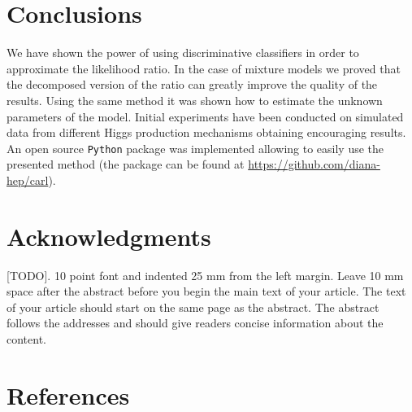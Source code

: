 \documentclass[a4paper]{jpconf}
\begin{document}



\section{Conclusions}
We have shown the power of using discriminative classifiers in order to approximate the likelihood ratio. In the case of mixture models we proved that the decomposed version of the ratio can greatly improve the quality of the results. Using the same method it was shown how to estimate the unknown parameters of the model. Initial experiments have been conducted on simulated data from different Higgs production mechanisms obtaining encouraging results. An open source \texttt{Python} package was implemented allowing to easily use the presented method (the package can be found at \url{https://github.com/diana-hep/carl}).
\section{Acknowledgments}
[TODO]. 10 point font and indented 25 mm from the left margin. Leave 10 mm space after the abstract before you begin the main text of your article. The text of your article should start on the same page as the abstract. The abstract follows the addresses and should give readers concise information about the content.


\section*{References}

\end{document}
